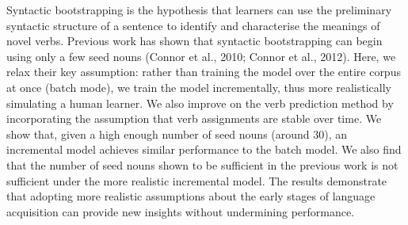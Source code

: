 Syntactic bootstrapping is the hypothesis that learners can use the preliminary syntactic structure of a sentence to identify and characterise the meanings of novel verbs. Previous work has shown that syntactic bootstrapping can begin using only a few seed nouns (Connor et al., 2010; Connor et al., 2012). Here, we relax their key assumption: rather than training the model over the entire corpus at once (batch mode), we train the model incrementally, thus more realistically simulating a human learner. We also improve on the verb prediction method by incorporating the assumption that verb assignments are stable over time. We show that, given a high enough number of seed nouns (around 30), an incremental model achieves similar performance to the batch model. We also find that the number of seed nouns shown to be sufficient in the previous work is not sufficient under the more realistic incremental model. The results demonstrate that adopting more realistic assumptions about the early stages of language acquisition can provide new insights without undermining performance.
